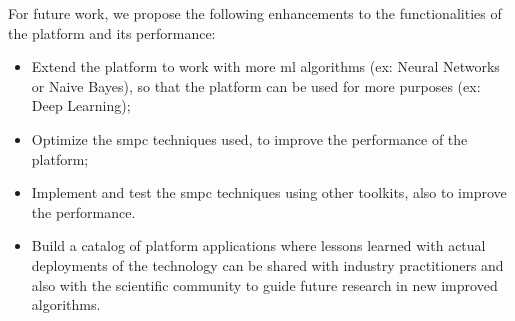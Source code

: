 For future work, we propose the following enhancements to the functionalities of the platform and its performance: 
\begin{itemize}
	\item Extend the platform to work with more \ac{ml} algorithms (ex: Neural Networks or Naive Bayes), so that the platform can be used for more purposes (ex: Deep Learning); 
	\item Optimize the \ac{smpc} techniques used, to improve the performance of the platform; 
	\item Implement and test the \ac{smpc} techniques using other toolkits, also to improve the performance.
	\item Build a catalog of platform applications where lessons learned with actual deployments of the technology can be shared with industry practitioners and also with the scientific community to guide future research in new improved algorithms.
\end{itemize}

